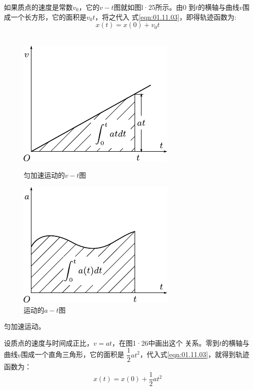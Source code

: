 如果质点的速度是常数$v_0$，它的$v-t$图就如图l·25所示。由0
到$t$的横轴与曲线$v$围成一个长方形，它的面积是$v_0t$，将之代入
式\eqref{eqn:01.11.03}，即得轨迹函数为:
\begin{equation}\label{eqn:01.11.04}
    x(t)=x(0)+v_0 t
\end{equation}
~\vspace{-1.5em}
\begin{figure}[!h]
    \begin{minipage}[b]{14em}
        \centering
        \includegraphics{figure/fig01.26.pdf}
        \caption{匀加速运动的$v-t$图}
        \label{fig:01.26}
    \end{minipage}\hfill
    \begin{minipage}[b]{14em}
        \centering
        \includegraphics{figure/fig01.27.pdf}
        \caption{运动的$a-t$图}
        \label{fig:01.27}
    \end{minipage}
\end{figure}

  \vspace{-1em}\example 匀加速运动。

  设质点的速度与时间成正比，$v=at$，在图1·26中画出这个
关系。零到$t$的横轴与曲线$v$围成一个直角三角形，它的面积是
$\dfrac{1}{2} a t^2$，代入式\eqref{eqn:01.11.03}，就得到轨迹函数为：
\begin{equation*}\label{eqn:01.11.04i}
    x(t)=x(0)+\frac{1}{2}at^2 \tag{1.11.4$'$}
\end{equation*}

